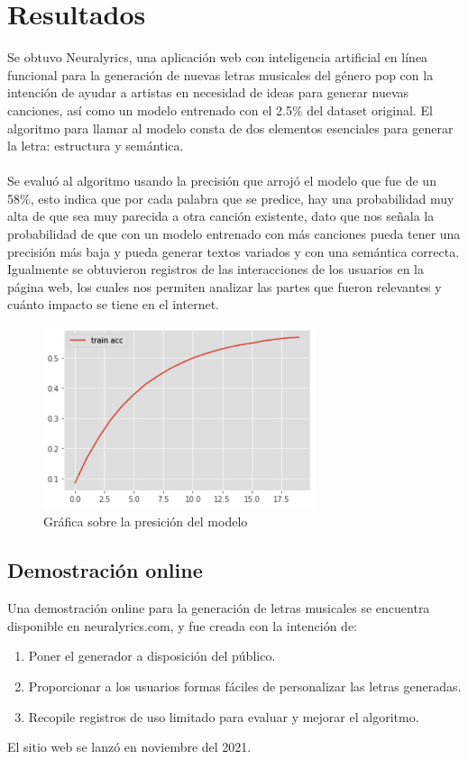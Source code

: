 \section{Resultados}
Se obtuvo Neuralyrics, una aplicación web con inteligencia artificial en línea funcional para la generación de nuevas letras musicales del género pop con la intención de ayudar a artistas en necesidad de ideas para generar nuevas canciones, así como un modelo entrenado con el 2.5\% del dataset original. El algoritmo para llamar al modelo consta de dos elementos esenciales para generar la letra: estructura y semántica.\\\\
Se evaluó al algoritmo usando la precisión que arrojó el modelo que fue de un 58\%, esto indica que por cada palabra que se predice, hay una probabilidad muy alta de que sea muy parecida a otra canción existente, dato que nos señala la probabilidad de que con un modelo entrenado con más canciones pueda tener una precisión más baja y pueda generar textos variados y con una semántica correcta. Igualmente se obtuvieron registros de las interacciones de los usuarios en la página web, los cuales nos permiten analizar las partes que fueron relevantes y cuánto impacto se tiene en el internet.
\begin{figure}[h]
	\centering
	\includegraphics[width=8cm]{figuras/Graficapre.png}
	\caption{Gráfica sobre la presición del modelo}
	\label{fig:Gráfica sobre la presición del modelo}
\end{figure}
\subsection{Demostración online}
Una demostración online para la generación de letras musicales se encuentra disponible en neuralyrics.com, y fue creada con la intención de:
\begin{enumerate}
    \item Poner el generador a disposición del público.
    \item Proporcionar a los usuarios formas fáciles de personalizar las letras generadas.
    \item Recopile registros de uso limitado para evaluar y mejorar el algoritmo.
\end{enumerate}
El sitio web se lanzó en noviembre del 2021.